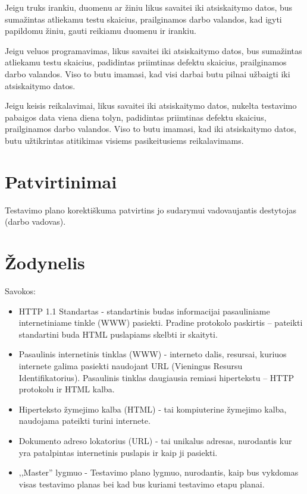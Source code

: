 \documentclass{VUMIFPSkursinis}
\begin{document}
Jeigu truks irankiu, duomenu ar žiniu likus savaitei iki atsiskaitymo datos, bus sumažintas atliekamu testu skaicius, prailginamos darbo valandos, kad igyti papildomu žiniu, gauti reikiamu duomenu ir irankiu.

Jeigu veluos programavimas, likus savaitei iki atsiskaitymo datos, bus sumažintas atliekamu testu skaicius, padidintas priimtinas defektu skaicius, prailginamos darbo valandos. Viso to butu imamasi, kad visi darbai butu pilnai užbaigti iki atsiskaitymo datos.

Jeigu keisis reikalavimai, likus savaitei iki atsiskaitymo datos, nukelta testavimo pabaigos data viena diena tolyn, padidintas priimtinas defektu skaicius, prailginamos darbo valandos. Viso to butu imamasi, kad iki atsiskaitymo datos, butu užtikrintas atitikimas visiems pasikeitusiems reikalavimams.

\section{Patvirtinimai}

Testavimo plano korektiškuma patvirtins jo sudarymui vadovaujantis destytojas (darbo vadovas).

\section{Žodynelis}

Savokos:

\begin{itemize}
	\item HTTP 1.1 Standartas - standartinis budas informacijai pasauliniame internetiniame tinkle (WWW) pasiekti. 
		  Pradine protokolo paskirtis – pateikti standartini buda HTML puslapiams skelbti ir skaityti.
	\item Pasaulinis internetinis tinklas (WWW) - interneto dalis, resursai, kuriuos internete galima pasiekti naudojant URL (Vieningus Resursu Identifikatorius).
		  Pasaulinis tinklas daugiausia remiasi hipertekstu – HTTP protokolu ir HTML kalba.
	\item Hiperteksto žymejimo kalba (HTML) - tai kompiuterine žymejimo kalba, naudojama pateikti turini internete.
	\item Dokumento adreso lokatorius (URL) - tai unikalus adresas, nurodantis kur yra patalpintas internetinis puslapis ir kaip ji pasiekti.
	\item ,,Master'' lygmuo - Testavimo plano lygmuo, nurodantis, kaip bus vykdomas visas testavimo planas bei kad bus kuriami testavimo etapu planai.
	
\end{itemize}
\end{document}
